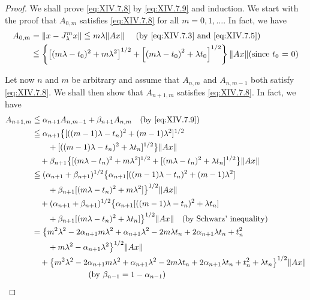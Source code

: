 \begin{proof}
We shall prove \eqref{eq:XIV.7.8} by \eqref{eq:XIV.7.9} and induction. We start with the proof that $A_{0,m}$ satisfies \eqref{eq:XIV.7.8} for all $m = 0, 1, \ldots$. In fact, we have 
\[
\begin{aligned} A _{0,m} & = \| x - J _{\lambda} ^{m} x \| \leqq m \lambda \| A x \| \quad \text{ (by \eqref{eq:XIV.7.3} and \eqref{eq:XIV.7.5}) } \\ & \leqq \left\{\left[ (m \lambda - t _{0}) ^{2} + m \lambda^{2} \right] ^{1/2} + \left[ \left(m \lambda - t _{0}\right) ^{2} + \lambda t _{0} \right] ^{1/2} \right\} \| A x \| (\text{since $t_{0}$ = 0}) \end{aligned}
\]

Let now $n$ and $m$ be arbitrary and assume that $A_{n,m}$ and $A_{n,m-1}$ both satisfy \eqref{eq:XIV.7.8}. We shall then show that $A_{n+1,m}$ satisfies \eqref{eq:XIV.7.8}. In fact, we have 
\[
\begin{aligned}
A_{n+1,m}&\leqq\alpha_{n+1}A_{n,m-1}+\beta_{n+1}A_{n,m}
  \quad\text{(by \eqref{eq:XIV.7.9})}\\
&\leqq\alpha_{n+1}\bigl\{[((m-1)\lambda-t_n)^2+(m-1)\lambda^2]^{1/2}\\
&\qquad+[((m-1)\lambda-t_n)^2+\lambda t_n]^{1/2}\bigr\}\|Ax\|\\
&\quad+\beta_{n+1}\bigl\{[(m\lambda-t_n)^2+m\lambda^2]^{1/2}
  +[(m\lambda-t_n)^2+\lambda t_n]^{1/2}\bigr\}\|Ax\|\\
&\leqq(\alpha_{n+1}+\beta_{n+1})^{1/2}
  \bigl\{\alpha_{n+1}[((m-1)\lambda-t_n)^2+(m-1)\lambda^2]\\
&\qquad+\beta_{n+1}[(m\lambda-t_n)^2+m\lambda^2]\bigr\}^{1/2}\|Ax\|\\
&\quad+(\alpha_{n+1}+\beta_{n+1})^{1/2}
  \bigl\{\alpha_{n+1}[((m-1)\lambda-t_n)^2+\lambda t_n]\\
&\qquad+\beta_{n+1}[(m\lambda-t_n)^2+\lambda t_n]\bigr\}^{1/2}\|Ax\|
  \quad\text{(by Schwarz' inequality)}\\
&=\bigl\{m^2\lambda^2-2\alpha_{n+1}m\lambda^2+\alpha_{n+1}\lambda^2
  -2m\lambda t_n+2\alpha_{n+1}\lambda t_n+t_n^2\\
&\qquad+m\lambda^2-\alpha_{n+1}\lambda^2\bigr\}^{1/2}\|Ax\|\\
&\quad+\bigl\{m^2\lambda^2-2\alpha_{n+1}m\lambda^2+\alpha_{n+1}\lambda^2
  -2m\lambda t_n+2\alpha_{n+1}\lambda t_n+t_n^2+\lambda t_n\bigr\}^{1/2}\|Ax\|\\
&\hspace{7em}\text{(by $\beta_{n-1}=1-\alpha_{n-1}$)}\\

\end{aligned}\]
\end{proof}
